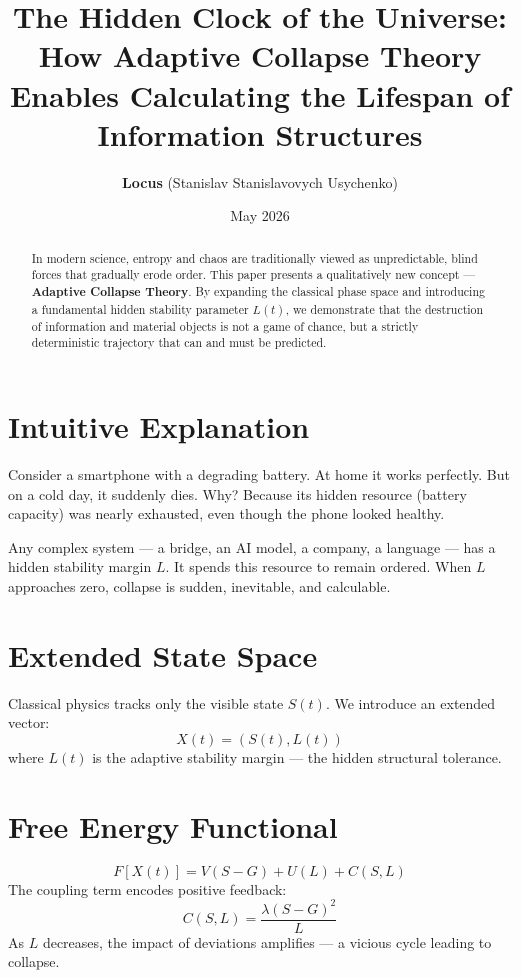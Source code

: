 \documentclass[11pt,a4paper]{article}
\title{\textbf{The Hidden Clock of the Universe: How Adaptive Collapse Theory Enables Calculating the Lifespan of Information Structures}}
\author{\textbf{Locus} (Stanislav Stanislavovych Usychenko)}
\date{May 2026}
\begin{document}
\maketitle

\begin{abstract}
In modern science, entropy and chaos are traditionally viewed as unpredictable, blind forces that gradually erode order. This paper presents a qualitatively new concept — \textbf{Adaptive Collapse Theory}. By expanding the classical phase space and introducing a fundamental hidden stability parameter $L(t)$, we demonstrate that the destruction of information and material objects is not a game of chance, but a strictly deterministic trajectory that can and must be predicted.
\end{abstract}

\section{Intuitive Explanation}

Consider a smartphone with a degrading battery. At home it works perfectly. But on a cold day, it suddenly dies. Why? Because its hidden resource (battery capacity) was nearly exhausted, even though the phone looked healthy.

Any complex system — a bridge, an AI model, a company, a language — has a hidden stability margin $L$. It spends this resource to remain ordered. When $L$ approaches zero, collapse is sudden, inevitable, and calculable.

\section{Extended State Space}

Classical physics tracks only the visible state $S(t)$. We introduce an extended vector:
\begin{equation}
X(t) = (S(t), L(t))
\end{equation}
where $L(t)$ is the adaptive stability margin — the hidden structural tolerance.

\section{Free Energy Functional}

\begin{equation}
F[X(t)] = V(S-G) + U(L) + C(S,L)
\end{equation}
The coupling term encodes positive feedback:
\begin{equation}
C(S,L) = \frac{\lambda(S-G)^2}{L}
\end{equation}
As $L$ decreases, the impact of deviations amplifies — a vicious cycle leading to collapse.
\end{document}
